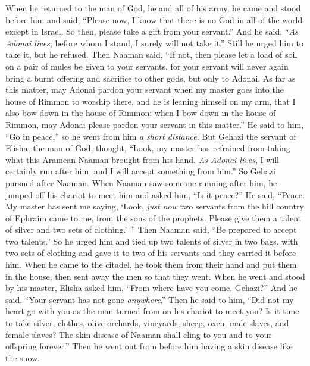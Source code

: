 \begin{biblechapter}
 When he returned to the man of God, he and all of his army, he came and stood before him and said, “Please now, I know that there is no God in all of the world except in Israel. So then, please take a gift from your servant.”
\verse And he said, “\textit{As Adonai lives}, before whom I stand, I surely will not take it.” Still he urged him to take it, but he refused.
\verse Then Naaman said, “If not, then please let a load of soil on a pair of mules be given to your servants, for your servant will never again bring a burnt offering and sacrifice to other gods, but only to Adonai.
\verse As far as this matter, may Adonai pardon your servant when my master goes into the house of Rimmon to worship there, and he is leaning himself on my arm, that I also bow down in the house of Rimmon: when I bow down in the house of Rimmon, may Adonai please pardon your servant in this matter.”
\verse He said to him, “Go in peace,” so he went from him \textit{a short distance}.
\verse But Gehazi the servant of Elisha, the man of God, thought, “Look, my master has refrained from taking what this Aramean Naaman brought from his hand. \textit{As Adonai lives}, I will certainly run after him, and I will accept something from him.”
\verse So Gehazi pursued after Naaman. When Naaman saw someone running after him, he jumped off his chariot to meet him and asked him, “Is it peace?”
\verse He said, “Peace. My master has sent me saying, ‘Look, \textit{just now} two servants from the hill country of Ephraim came to me, from the sons of the prophets. Please give them a talent of silver and two sets of clothing.’ ”
\verse Then Naaman said, “Be prepared to accept two talents.” So he urged him and tied up two talents of silver in two bags, with two sets of clothing and gave it to two of his servants and they carried it before him.
\verse When he came to the citadel, he took them from their hand and put them in the house, then sent away the men so that they went.
\verse When he went and stood by his master, Elisha asked him, “From where have you come, Gehazi?” And he said, “Your servant has not gone \textit{anywhere}.”
\verse Then he said to him, “Did not my heart go with you as the man turned from on his chariot to meet you? Is it time to take silver, clothes, olive orchards, vineyards, sheep, oxen, male slaves, and female slaves?
\verse The skin disease of Naaman shall cling to you and to your offspring forever.” Then he went out from before him having a skin disease like the snow.
\end{biblechapter}

